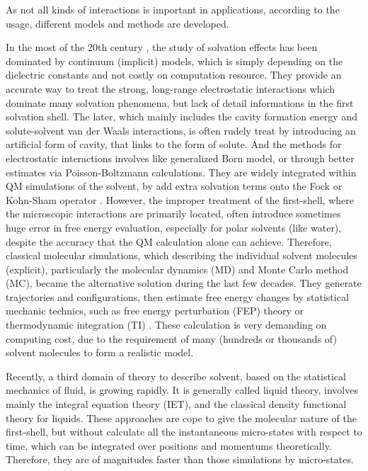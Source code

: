 As not all kinds of interactions is important in applications, according
to the usage, different models and methods are developed.

In the most of the 20th century \citep{Cramer_1999}, the study of
solvation effects has been dominated by continuum (implicit) models,
which is simply depending on the dielectric constants and not costly
on computation resource. They provide an accurate way to treat the
strong, long-range electrostatic interactions which dominate many
solvation phenomena, but lack of detail informations in the first
solvation shell. The later, which mainly includes the cavity formation
energy and solute-solvent van der Waals interactions, is often rudely
treat by introducing an artificial form of cavity, that links to the
form of solute. And the methods for electrostatic interactions involves
like generalized Born model, or through better estimates via Poisson-Boltzmann
calculations. They are widely integrated within \acs{QM} simulations
of the solvent, by add extra solvation terms onto the Fock or Kohn-Sham
operator \citep{Jensen,scrf,Tomasi_1994_implicit_model}. However,
the improper treatment of the first-shell, where the microscopic interactions
are primarily located, often introduce sometimes huge error in free
energy evaluation, especially for polar solvents (like water), despite
the accuracy that the \acs{QM} calculation alone can achieve. Therefore,
classical molecular simulations, which describing the individual solvent
molecules (explicit), particularly the molecular dynamics (\acs{MD})
and Monte Carlo method (\acs{MC}), became the alternative solution
during the last few decades. They generate trajectories and configurations,
then estimate free energy changes by statistical mechanic technics,
such as free energy perturbation (FEP) theory or thermodynamic integration
(TI) \citep{Jorgensen_1995_MC}. These calculation is very demanding
on computing cost, due to the requirement of many (hundreds or thousands
of) solvent molecules to form a realistic model.

Recently, a third domain of theory to describe solvent, based on the
statistical mechanics of fluid, is growing rapidly. It is generally
called liquid theory, involves mainly the integral equation theory
(\acs{IET}), and the classical density functional theory for liquids.
These approaches are cope to give the molecular nature of the first-shell,
but without calculate all the instantaneous micro-states with respect
to time, which can be integrated over positions and momentums theoretically.
Therefore, they are of magnitudes faster than those simulations by
micro-states.

